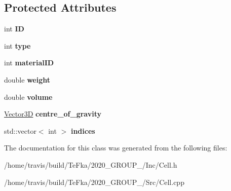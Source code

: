 \subsection*{Protected Attributes}
\begin{DoxyCompactItemize}
\item 
int {\bfseries ID}\hypertarget{class_cell_a94f1fa1e227b638d8732524e43589392}{}\label{class_cell_a94f1fa1e227b638d8732524e43589392}

\item 
int {\bfseries type}\hypertarget{class_cell_a6a3f3ec6c13524695884f3a302b23d88}{}\label{class_cell_a6a3f3ec6c13524695884f3a302b23d88}

\item 
int {\bfseries material\+ID}\hypertarget{class_cell_a7a478d78dd2f456cdcbdaa62c9a45323}{}\label{class_cell_a7a478d78dd2f456cdcbdaa62c9a45323}

\item 
double {\bfseries weight}\hypertarget{class_cell_a33f783e27040648251570bb281d5c744}{}\label{class_cell_a33f783e27040648251570bb281d5c744}

\item 
double {\bfseries volume}\hypertarget{class_cell_a426862431a79984cb040c6f396a8e1d9}{}\label{class_cell_a426862431a79984cb040c6f396a8e1d9}

\item 
\hyperlink{class_vector3_d}{Vector3D} {\bfseries centre\+\_\+of\+\_\+gravity}\hypertarget{class_cell_ab57b28c71b2dc2dcc7c95ac73b5b5375}{}\label{class_cell_ab57b28c71b2dc2dcc7c95ac73b5b5375}

\item 
std\+::vector$<$ int $>$ {\bfseries indices}\hypertarget{class_cell_a9e0ea8c2547718c8b34694d6d0db2c9e}{}\label{class_cell_a9e0ea8c2547718c8b34694d6d0db2c9e}

\end{DoxyCompactItemize}


The documentation for this class was generated from the following files\+:\begin{DoxyCompactItemize}
\item 
/home/travis/build/\+Te\+Fka/2020\+\_\+\+G\+R\+O\+U\+P\+\_/\+Inc/Cell.\+h\item 
/home/travis/build/\+Te\+Fka/2020\+\_\+\+G\+R\+O\+U\+P\+\_/\+Src/Cell.\+cpp\end{DoxyCompactItemize}
